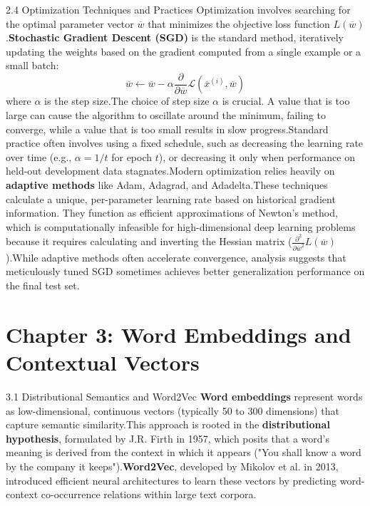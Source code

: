 \documentclass{article}
\begin{document}
2.4 Optimization Techniques and Practices
Optimization involves searching for the optimal parameter vector $\overline{w}$ that minimizes the objective loss function $L(\overline{w})$.\footnotemark[1] \textbf{Stochastic Gradient Descent (SGD)} is the standard method, iteratively updating the weights based on the gradient computed from a single example or a small batch:
$$\overline{w}\leftarrow\overline{w}-\alpha\frac{\partial}{\partial\overline{w}}\mathcal{L}(\overline{x}^{(i)}, \overline{w})$$
where $\alpha$ is the step size.\footnotemark[1]
The choice of step size $\alpha$ is crucial. A value that is too large can cause the algorithm to oscillate around the minimum, failing to converge, while a value that is too small results in slow progress.\footnotemark[1] Standard practice often involves using a fixed schedule, such as decreasing the learning rate over time (e.g., $\alpha=1/t$ for epoch $t$), or decreasing it only when performance on held-out development data stagnates.\footnotemark[1]
Modern optimization relies heavily on \textbf{adaptive methods} like Adam, Adagrad, and Adadelta.\footnotemark[1] These techniques calculate a unique, per-parameter learning rate based on historical gradient information. They function as efficient approximations of Newton’s method, which is computationally infeasible for high-dimensional deep learning problems because it requires calculating and inverting the Hessian matrix ($\frac{\partial^2}{\partial\overline{w}^2}L(\overline{w})$).\footnotemark[1] While adaptive methods often accelerate convergence, analysis suggests that meticulously tuned SGD sometimes achieves better generalization performance on the final test set.\footnotemark[1]

\section{Chapter 3: Word Embeddings and Contextual Vectors}
3.1 Distributional Semantics and Word2Vec
\textbf{Word embeddings} represent words as low-dimensional, continuous vectors (typically 50 to 300 dimensions) that capture semantic similarity.\footnotemark[1] This approach is rooted in the \textbf{distributional hypothesis}, formulated by J.R. Firth in 1957, which posits that a word's meaning is derived from the context in which it appears ("You shall know a word by the company it keeps").\footnotemark[1]
\textbf{Word2Vec}, developed by Mikolov et al. in 2013, introduced efficient neural architectures to learn these vectors by predicting word-context co-occurrence relations within large text corpora.\footnotemark[1]
\end{document}
